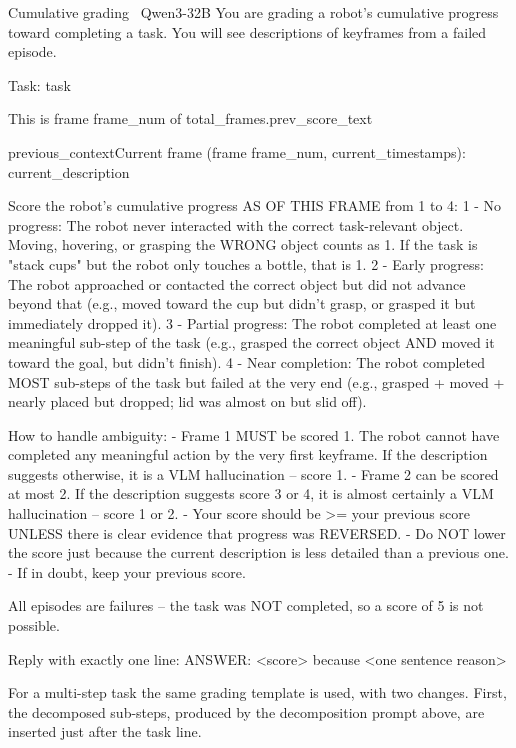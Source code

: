 \begin{llmprompt}{Cumulative grading \textbullet\ Qwen3-32B}
You are grading a robot's cumulative progress toward completing a task. You will see descriptions of keyframes from a failed episode.

Task: {task}

This is frame {frame_num} of {total_frames}.{prev_score_text}

{previous_context}Current frame (frame {frame_num}, {current_timestamp}s):
{current_description}

Score the robot's cumulative progress AS OF THIS FRAME from 1 to 4:
1 - No progress: The robot never interacted with the correct task-relevant object. Moving, hovering, or grasping the WRONG object counts as 1. If the task is "stack cups" but the robot only touches a bottle, that is 1.
2 - Early progress: The robot approached or contacted the correct object but did not advance beyond that (e.g., moved toward the cup but didn't grasp, or grasped it but immediately dropped it).
3 - Partial progress: The robot completed at least one meaningful sub-step of the task (e.g., grasped the correct object AND moved it toward the goal, but didn't finish).
4 - Near completion: The robot completed MOST sub-steps of the task but failed at the very end (e.g., grasped + moved + nearly placed but dropped; lid was almost on but slid off).

How to handle ambiguity:
- Frame 1 MUST be scored 1. The robot cannot have completed any meaningful action by the very first keyframe. If the description suggests otherwise, it is a VLM hallucination -- score 1.
- Frame 2 can be scored at most 2. If the description suggests score 3 or 4, it is almost certainly a VLM hallucination -- score 1 or 2.
- Your score should be >= your previous score UNLESS there is clear evidence that progress was REVERSED.
- Do NOT lower the score just because the current description is less detailed than a previous one.
- If in doubt, keep your previous score.

All episodes are failures -- the task was NOT completed, so a score of 5 is not possible.

Reply with exactly one line: ANSWER: <score> because <one sentence reason>
\end{llmprompt}

For a multi-step task the same grading template is used, with two changes. First, the decomposed sub-steps, produced by the decomposition prompt above, are inserted just after the task line.

